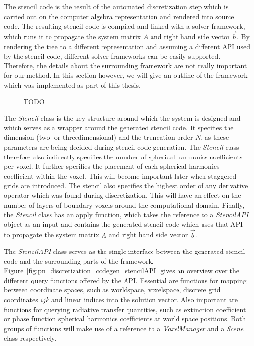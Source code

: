 The stencil code is the result of the automated discretization step which is carried out on the computer algebra representation and rendered into source code. The resulting stencil code is compiled and linked with a solver framework, which runs it to propagate the system matrix $A$ and right hand side vector $\vec{b}$. By rendering the tree to a different representation and assuming a different API used by the stencil code, different solver frameworks can be easily supported.
Therefore, the details about the surrounding framework are not really important for our method. In this section however, we will give an outline of the framework which was implemented as part of this thesis.
\begin{figure}[h]
\centering
{}
\caption{TODO}
\label{fig:pn_classes}
\end{figure}

The \emph{Stencil} class is the key structure around which the system is designed and which serves as a wrapper around the generated stencil code. It specifies the dimension (two- or threedimensional) and the truncation order $N$, as these parameters are being decided during stencil code generation. The \emph{Stencil} class therefore also indirectly specifies the number of spherical harmonics coefficients per voxel. It further specifies the placement of each spherical harmonics coefficient within the voxel. This will become important later when staggered grids are introduced. The stencil also specifies the highest order of any derivative operator which was found during discretization. This will have an effect on the number of layers of boundary voxels around the computational domain. Finally, the \emph{Stencil} class has an apply function, which takes the reference to a \emph{StencilAPI} object as an input and contains the generated stencil code which uses that API to propagate the system matrix $A$ and right hand side vector $\vec{b}$.

The \emph{StencilAPI} class serves as the single interface between the generated stencil code and the surrounding parts of the framework. Figure~\ref{fig:pn_discretization_codegen_stencilAPI} gives an overview over the different query functions offered by the API. Essential are functions for mapping between coordinate spaces, such as worldspace, voxelspace, discrete grid coordinates $ijk$ and linear indices into the solution vector. Also important are functions for querying radiative transfer quantities, such as extinction coefficient or phase function spherical harmonics coefficients at world space positions. Both groups of functions will make use of a reference to a \emph{VoxelManager} and a \emph{Scene} class respectively.

